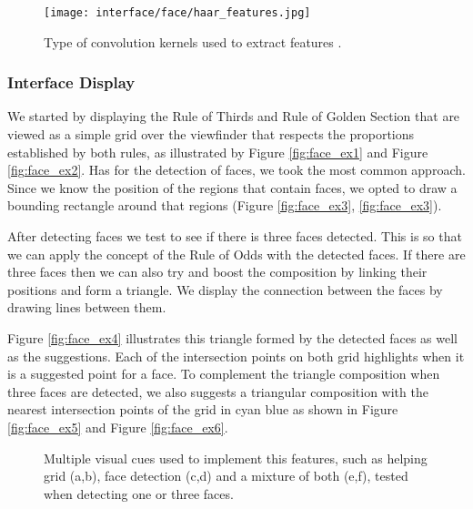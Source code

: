 \begin{figure}[htb]
	\centering
	\texttt{[image: interface/face/haar\_features.jpg]}
  	\caption{Type of convolution kernels used to extract features \cite{OCV}.}
	\label{fig:haar_features}
\end{figure}

\subsubsection{Interface Display}

We started by displaying the Rule of Thirds and Rule of Golden Section that are viewed as a simple grid over the viewfinder that respects the proportions established by both rules, as illustrated by Figure \ref{fig:face_ex1} and Figure \ref{fig:face_ex2}.
Has for the detection of faces, we took the most common approach. Since we know the position of the regions that contain faces, we opted to draw a bounding rectangle around that regions (Figure \ref{fig:face_ex3}, \ref{fig:face_ex3}).

After detecting faces we test to see if there is three faces detected. This is so that we can apply the concept of the Rule of Odds with the detected faces. If there are three faces then we can also try and boost the composition by linking their positions and form a triangle. We display the connection between the faces by drawing lines between them.

Figure \ref{fig:face_ex4} illustrates this triangle formed by the detected faces as well as the suggestions. Each of the intersection points on both grid highlights when it is a suggested point for a face. To complement the triangle composition when three faces are detected, we also suggests a triangular composition with the nearest intersection points of the grid in cyan blue as shown in Figure \ref{fig:face_ex5} and Figure \ref{fig:face_ex6}.
\begin{figure}[htbp]
	\centering
  	\caption{Multiple visual cues used to implement this features, such as helping grid (a,b), face detection (c,d) and a mixture of both (e,f), tested when detecting one or three faces.}
	\label{fig:face_interface}
\end{figure}

